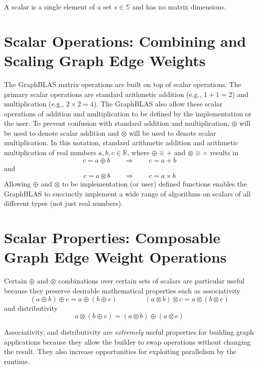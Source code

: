   A scalar is a single element of a set $s \in \mathbb{S}$ and has no matrix dimensions.

\section{Scalar Operations: Combining and Scaling Graph Edge Weights}
  The GraphBLAS matrix operations are built on top of scalar operations.  The primary scalar operations are standard arithmetic addition (e.g., $1 + 1 = 2$) and multiplication (e.g., $2 \times 2 = 4$).  The GraphBLAS also allow these scalar operations of addition and multiplication to be defined by the implementation or the user.  To prevent confusion with standard addition and multiplication, $\oplus$ will be used to denote scalar addition and $\otimes$ will be used to denote scalar multiplication.  In this notation, standard arithmetic addition and arithmetic multiplication of real numbers $a, b, c \in \mathbb{R}$, where $\oplus \equiv +$ and $\otimes \equiv \times$ results in
$$
   c = a \oplus b  ~~~~~~~~~ \Rightarrow ~~~~~~~~~ c = a + b
$$
and
$$
   c = a \otimes b  ~~~~~~~~~ \Rightarrow ~~~~~~~~~ c = a \times b
$$
Allowing $\oplus$ and $\otimes$ to be implementation (or user) defined functions enables the GraphBLAS to succinctly implement a wide range of algorithms on scalars of all different types (not just real numbers).

\section{Scalar Properties: Composable Graph Edge Weight Operations}
  Certain $\oplus$ and $\otimes$ combinations  over certain sets of scalars are particular useful because they preserve desirable mathematical properties such as
associativity
$$
 (a \oplus b) \oplus c = a \oplus (b \oplus c) ~~~~~~~~~ ~~~~~~~~~ (a \otimes b) \otimes c = a \otimes (b \otimes c)
$$
and distributivity
$$
 a \otimes (b \oplus c)  = (a \otimes b) \oplus (a \otimes c)
$$

Associativity, and distributivity are \emph{extremely} useful properties for building graph applications because they allow the builder to swap operations without changing the result. They also increase opportunities for exploiting parallelism by the runtime. 

